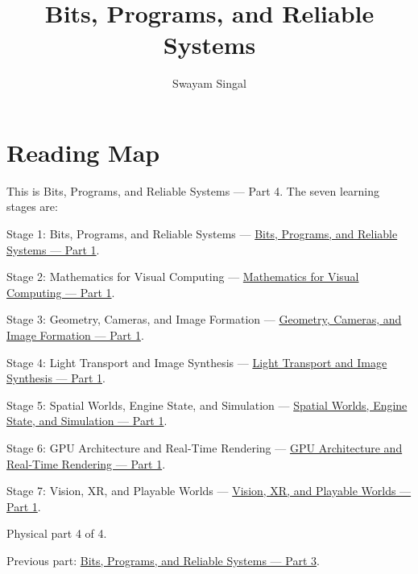 \documentclass[11pt,twoside,openany]{book}
\title{Bits, Programs, and Reliable Systems}
\author{Swayam Singal}
\begin{document}
\maketitle
\begin{center}\end{center}
\chapter*{Reading Map}
\hypertarget{volume-reading-map}{}
\noindent This is Bits, Programs, and Reliable Systems --- Part 4. The seven learning stages are:
\par\noindent Stage 1: Bits, Programs, and Reliable Systems --- \href{../01-Bits-Programs-and-Reliable-Systems-P01/main.pdf}{Bits, Programs, and Reliable Systems — Part 1}.
\par\noindent Stage 2: Mathematics for Visual Computing --- \href{../02-Mathematics-for-Visual-Computing-P01/main.pdf}{Mathematics for Visual Computing — Part 1}.
\par\noindent Stage 3: Geometry, Cameras, and Image Formation --- \href{../03-Geometry-Cameras-and-Image-Formation-P01/main.pdf}{Geometry, Cameras, and Image Formation — Part 1}.
\par\noindent Stage 4: Light Transport and Image Synthesis --- \href{../04-Light-Transport-and-Image-Synthesis-P01/main.pdf}{Light Transport and Image Synthesis — Part 1}.
\par\noindent Stage 5: Spatial Worlds, Engine State, and Simulation --- \href{../05-Spatial-Worlds-Engine-State-and-Simulation-P01/main.pdf}{Spatial Worlds, Engine State, and Simulation — Part 1}.
\par\noindent Stage 6: GPU Architecture and Real-Time Rendering --- \href{../06-GPU-Architecture-and-Real-Time-Rendering-P01/main.pdf}{GPU Architecture and Real-Time Rendering — Part 1}.
\par\noindent Stage 7: Vision, XR, and Playable Worlds --- \href{../07-Vision-XR-and-Playable-Worlds-P01/main.pdf}{Vision, XR, and Playable Worlds — Part 1}.
\par\noindent Physical part 4 of 4.
\par\noindent Previous part: \href{../01-Bits-Programs-and-Reliable-Systems-P03/main.pdf}{Bits, Programs, and Reliable Systems — Part 3}.
\tableofcontents
\mainmatter
\setcounter{chapter}{10}


\end{document}
